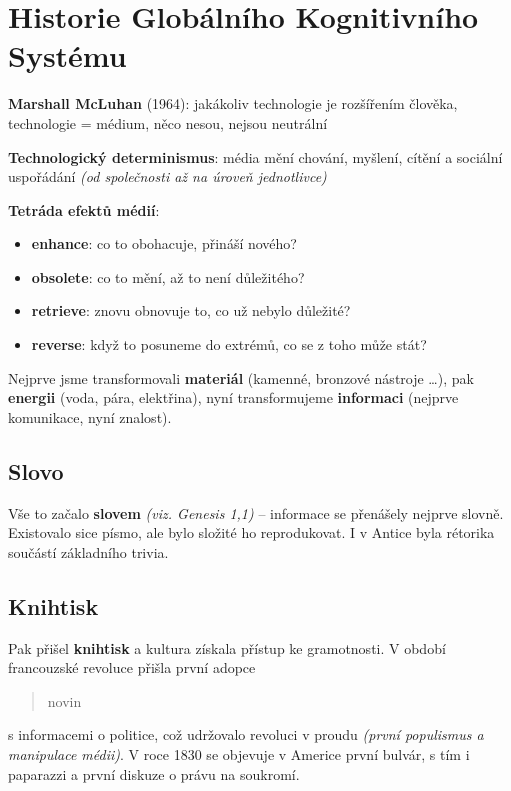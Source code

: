 \section{Historie Globálního Kognitivního Systému}

\vspace{8pt}

\noindent \textbf{Marshall McLuhan} (1964): jakákoliv technologie je rozšířením člověka, technologie = médium, něco nesou, nejsou neutrální

\vspace{4pt}
\noindent \textbf{Technologický determinismus}: média mění chování, myšlení, cítění a sociální uspořádání \textit{(od společnosti až na úroveň jednotlivce)}

\vspace{8pt}
\noindent \textbf{Tetráda efektů médií}:
\begin{itemize}
    \item \textbf{enhance}: co to obohacuje, přináší nového?
    \item \textbf{obsolete}: co to mění, až to není důležitého?
    \item \textbf{retrieve}: znovu obnovuje to, co už nebylo důležité?
    \item \textbf{reverse}: když to posuneme do extrémů, co se z toho může stát?
\end{itemize}

\noindent Nejprve jsme transformovali \textbf{materiál} (kamenné, bronzové nástroje \ldots), pak \textbf{energii} (voda, pára, elektřina), nyní transformujeme \textbf{informaci} (nejprve komunikace, nyní znalost).

\subsection{Slovo}

Vše to začalo \textbf{slovem} \textit{(viz. Genesis 1,1)} -- informace se přenášely nejprve slovně. Existovalo sice písmo, ale bylo složité ho reprodukovat. I v Antice byla rétorika součástí základního trivia.

\subsection{Knihtisk}

Pak přišel \textbf{knihtisk} a kultura získala přístup ke gramotnosti. V období francouzské revoluce přišla první adopce \blockquote{novin} s informacemi o politice, což udržovalo revoluci v proudu \textit{(první populismus a manipulace médii)}. V roce 1830 se objevuje v Americe první bulvár, s tím i paparazzi a první diskuze o právu na soukromí.

